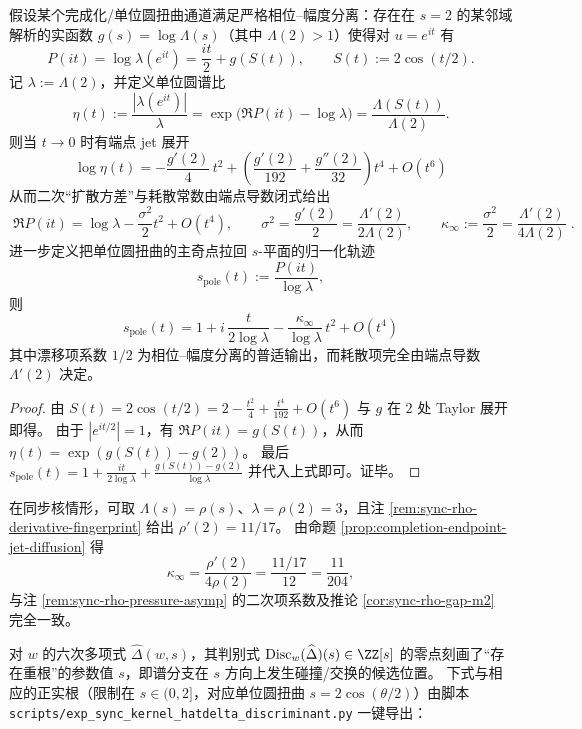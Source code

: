 \begin{proposition}\label{prop:completion-endpoint-jet-diffusion}
假设某个完成化/单位圆扭曲通道满足严格相位--幅度分离：存在在 \(s=2\) 的某邻域解析的实函数 \(g(s)=\log\Lambda(s)\)（其中 \(\Lambda(2)>1\)）使得对 \(u=e^{it}\) 有
\[
P(it)=\log\lambda(e^{it})=\frac{it}{2}+g\!\left(S(t)\right),
\qquad
S(t):=2\cos(t/2).
\]
记 \(\lambda:=\Lambda(2)\)，并定义单位圆谱比
\[
\eta(t):=\frac{|\lambda(e^{it})|}{\lambda}
=\exp\!\bigl(\Re P(it)-\log\lambda\bigr)
=\frac{\Lambda(S(t))}{\Lambda(2)}.
\]
则当 \(t\to 0\) 时有端点 jet 展开
\[
\boxed{\;
\log\eta(t)
=-\frac{g'(2)}{4}\,t^{2}
+\left(\frac{g'(2)}{192}+\frac{g''(2)}{32}\right)t^{4}
+O(t^{6})\;}
\]
从而二次“扩散方差”与耗散常数由端点导数闭式给出
\[
\boxed{\;
\Re P(it)=\log\lambda-\frac{\sigma^{2}}{2}t^{2}+O(t^{4}),\qquad
\sigma^{2}=\frac{g'(2)}{2}=\frac{\Lambda'(2)}{2\Lambda(2)},\qquad
\kappa_\infty:=\frac{\sigma^{2}}{2}=\frac{\Lambda'(2)}{4\Lambda(2)}\; }.
\]
进一步定义把单位圆扭曲的主奇点拉回 \(s\)-平面的归一化轨迹
\[
s_{\mathrm{pole}}(t):=\frac{P(it)}{\log\lambda},
\]
则
\[
\boxed{\;
s_{\mathrm{pole}}(t)
=1+i\,\frac{t}{2\log\lambda}-\frac{\kappa_\infty}{\log\lambda}\,t^{2}+O(t^{4})\;}
\]
其中漂移项系数 \(1/2\) 为相位--幅度分离的普适输出，而耗散项完全由端点导数 \(\Lambda'(2)\) 决定。
\end{proposition}
\begin{proof}
由 \(S(t)=2\cos(t/2)=2-\frac{t^{2}}{4}+\frac{t^{4}}{192}+O(t^{6})\) 与 \(g\) 在 \(2\) 处 Taylor 展开即得。
由于 \(|e^{it/2}|=1\)，有 \(\Re P(it)=g(S(t))\)，从而 \(\eta(t)=\exp(g(S(t))-g(2))\)。
最后 \(s_{\mathrm{pole}}(t)=1+\frac{it}{2\log\lambda}+\frac{g(S(t))-g(2)}{\log\lambda}\) 并代入上式即可。证毕。
\end{proof}

\begin{remark}\label{rem:sync-endpoint-diffusion-check}
在同步核情形，可取 \(\Lambda(s)=\rho(s)\)、\(\lambda=\rho(2)=3\)，且注 \ref{rem:sync-rho-derivative-fingerprint} 给出 \(\rho'(2)=11/17\)。
由命题 \ref{prop:completion-endpoint-jet-diffusion} 得
\[
\kappa_\infty=\frac{\rho'(2)}{4\rho(2)}=\frac{11/17}{12}=\frac{11}{204},
\]
与注 \ref{rem:sync-rho-pressure-asymp} 的二次项系数及推论 \ref{cor:sync-rho-gap-m2} 完全一致。
\end{remark}

\begin{remark}\label{rem:sync-hatdelta-discriminant-branch}
对 \(w\) 的六次多项式 \(\widehat\Delta(w,s)\)，其判别式 \(\mathrm{Disc}_w(\widehat\Delta)(s)\in\ZZ[s]\) 的零点刻画了“存在重根”的参数值 \(s\)，即谱分支在 \(s\) 方向上发生碰撞/交换的候选位置。
下式与相应的正实根（限制在 \(s\in(0,2]\)，对应单位圆扭曲 \(s=2\cos(\theta/2)\)）由脚本 \texttt{scripts/exp\_sync\_kernel\_hatdelta\_discriminant.py} 一键导出：


\end{remark}

